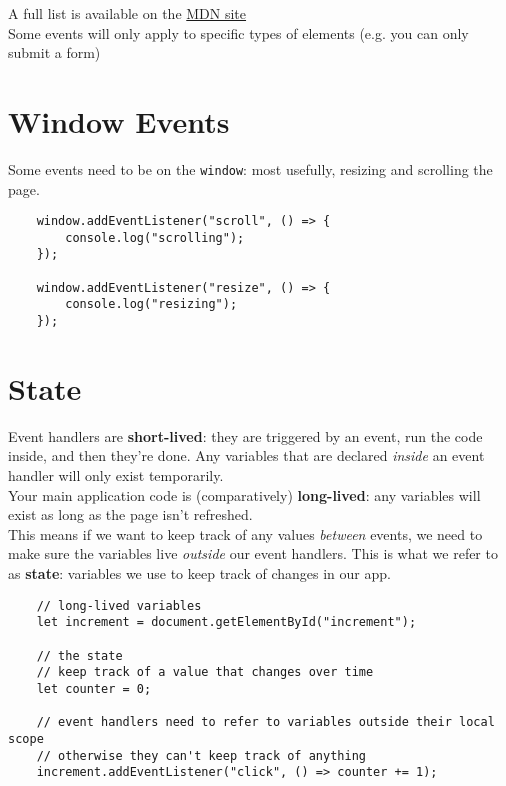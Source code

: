 A full list is available on the \href{https://developer.mozilla.org/en-US/docs/Web/Events}{MDN site}
\\

Some events will only apply to specific types of elements (e.g. you can only submit a form)

\pagebreak

\section{Window Events}

Some events need to be on the \texttt{window}: most usefully, resizing and scrolling the page.

\begin{verbatim}
    window.addEventListener("scroll", () => {
        console.log("scrolling");
    });

    window.addEventListener("resize", () => {
        console.log("resizing");
    });
\end{verbatim}



\section{State}

Event handlers are \textbf{short-lived}: they are triggered by an event, run the code inside, and then they're done. Any variables that are declared \textit{inside} an event handler will only exist temporarily.
\\

Your main application code is (comparatively) \textbf{long-lived}: any variables will exist as long as the page isn't refreshed.
\\

This means if we want to keep track of any values \textit{between} events, we need to make sure the variables live \textit{outside} our event handlers. This is what we refer to as \textbf{state}: variables we use to keep track of changes in our app.

\begin{verbatim}
    // long-lived variables
    let increment = document.getElementById("increment");

    // the state
    // keep track of a value that changes over time
    let counter = 0;

    // event handlers need to refer to variables outside their local scope
    // otherwise they can't keep track of anything
    increment.addEventListener("click", () => counter += 1);
\end{verbatim}


